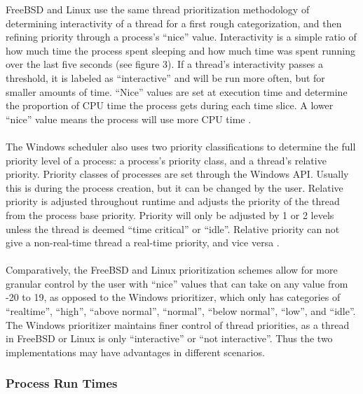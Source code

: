 \documentclass[10pt,draftclsnofoot,onecolumn]{article}
\begin{document}
FreeBSD and Linux use the same thread prioritization methodology of determining interactivity of a thread for a first rough categorization, and then refining priority through a process’s “nice” value. Interactivity is a simple ratio of how much time the process spent sleeping and how much time was spent running over the last five seconds (see figure 3). If a thread’s interactivity passes a threshold, it is labeled as “interactive” and will be run more often, but for smaller amounts of time. “Nice” values are set at execution time and determine the proportion of CPU time the process gets during each time slice. A lower “nice” value means the process will use more CPU time \cite{215951, Roberson03ule:a}. 
\\\\	
The Windows scheduler also uses two priority classifications to determine the full priority level of a process: a process’s priority class, and a thread’s relative priority. Priority classes of processes are set through the Windows API. Usually this is during the process creation, but it can be changed by the user. Relative priority is adjusted throughout runtime and adjusts the priority of the thread from the process base priority. Priority will only be adjusted by 1 or 2 levels unless the thread is deemed “time critical” or “idle”. Relative priority can not give a non-real-time thread a real-time priority, and vice versa \cite{Wandos}. 
\\\\
Comparatively, the FreeBSD and Linux prioritization schemes allow for more granular control by the user with “nice” values that can take on any value from -20 to 19, as opposed to the Windows prioritizer, which only has categories of “realtime”, “high”, “above normal”, “normal”, “below normal”, “low”, and “idle”. The Windows prioritizer maintains finer control of thread priorities, as a thread in FreeBSD or Linux is only “interactive” or “not interactive”. Thus the two implementations may have advantages in different scenarios.

\subsubsection{Process Run Times}
\end{document}
